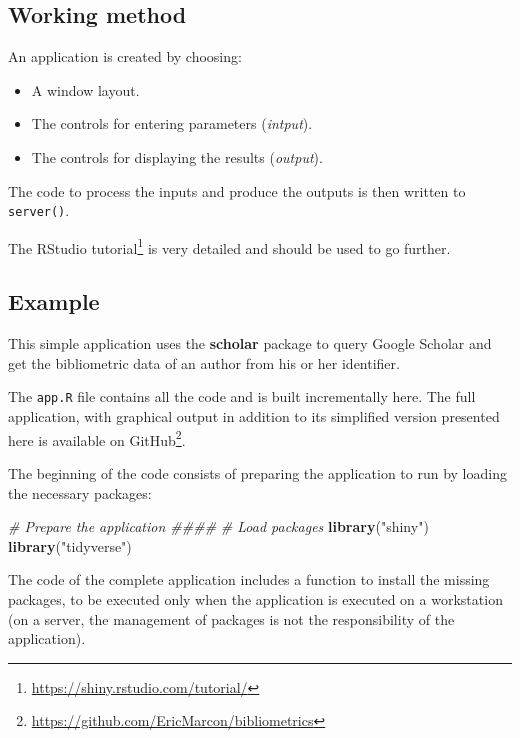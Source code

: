 \documentclass[
  12pt,
  american,
  a4paper,
  extrafontsizes,onecolumn,openright
  ]{memoir}
\newenvironment{Shaded}{\begin{snugshade}}{\end{snugshade}}
\newcommand{\CommentTok}[1]{\textcolor[rgb]{0.56,0.35,0.01}{\textit{#1}}}
\newcommand{\FunctionTok}[1]{\textcolor[rgb]{0.13,0.29,0.53}{\textbf{#1}}}
\newcommand{\NormalTok}[1]{#1}
\newcommand{\StringTok}[1]{\textcolor[rgb]{0.31,0.60,0.02}{#1}}
\providecommand{\tightlist}{%
  \setlength{\itemsep}{0pt}\setlength{\parskip}{0pt}}
\begin{document}
\subsection{Working method}\label{working-method}

An application is created by choosing:

\begin{itemize}
\tightlist
\item
  A window layout.
\item
  The controls for entering parameters (\emph{intput}).
\item
  The controls for displaying the results (\emph{output}).
\end{itemize}

The code to process the inputs and produce the outputs is then written to \texttt{server()}.

The RStudio tutorial\footnote{\url{https://shiny.rstudio.com/tutorial/}} is very detailed and should be used to go further.

\subsection{Example}\label{example}

This simple application uses the \textbf{scholar} package to query Google Scholar and get the bibliometric data of an author from his or her identifier.

The \texttt{app.R} file contains all the code and is built incrementally here.
The full application, with graphical output in addition to its simplified version presented here is available on GitHub\footnote{\url{https://github.com/EricMarcon/bibliometrics}}.

The beginning of the code consists of preparing the application to run by loading the necessary packages:

\scriptsize

\begin{Shaded}
\begin{Highlighting}[]
\CommentTok{\# Prepare the application \#\#\#\#}
\CommentTok{\# Load packages}
\FunctionTok{library}\NormalTok{(}\StringTok{"shiny"}\NormalTok{)}
\FunctionTok{library}\NormalTok{(}\StringTok{"tidyverse"}\NormalTok{)}
\end{Highlighting}
\end{Shaded}

\normalsize

The code of the complete application includes a function to install the missing packages, to be executed only when the application is executed on a workstation (on a server, the management of packages is not the responsibility of the application).
\end{document}
